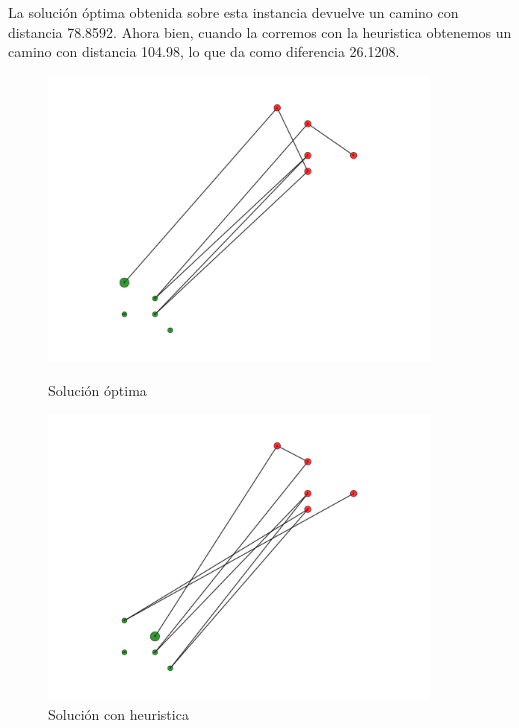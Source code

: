 \newpage

La solución óptima obtenida sobre esta instancia devuelve un camino con distancia 78.8592.
Ahora bien, cuando la corremos con la heuristica obtenemos un camino con distancia 104.98, lo que da como diferencia 26.1208.

\begin{figure}[H]
\centering
\begin{minipage}{0.45\textwidth}
\includegraphics[width=0.9\textwidth]{imagenes/test1-soltest1BT.pdf}
\caption{Solución óptima}
\label{fig:ej2_caso1bt}
\end{minipage}
\qquad
\begin{minipage}{0.45\textwidth}
\includegraphics[width=0.9\textwidth]{imagenes/test1-soltest1H.pdf}
\caption{Solución con heuristica}
\label{fig:ej2_caso1h}
\end{minipage}
\end{figure}


